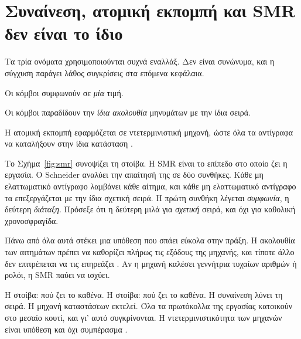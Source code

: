 \section{Συναίνεση, ατομική εκπομπή και SMR δεν είναι το ίδιο}
\label{sec:smr}

Τα τρία ονόματα χρησιμοποιούνται συχνά εναλλάξ. Δεν είναι συνώνυμα, και
η σύγχυση παράγει λάθος συγκρίσεις στα επόμενα κεφάλαια.

\begin{description}[leftmargin=2.2em,style=nextline,font=\normalfont\bfseries]
  \item[Συναίνεση (\en{consensus}).] Οι κόμβοι συμφωνούν σε \emph{μία}
  τιμή.
  \item[Ατομική εκπομπή (\en{atomic broadcast}).] Οι κόμβοι παραδίδουν
  την \emph{ίδια ακολουθία} μηνυμάτων με την ίδια σειρά.
  \item[Αναπαραγωγή μηχανής καταστάσεων (SMR).] Η ατομική εκπομπή
  εφαρμόζεται σε ντετερμινιστική μηχανή, ώστε όλα τα αντίγραφα να
  καταλήξουν στην ίδια κατάσταση \cite{schneider1990implementing}.
\end{description}

Το Σχήμα~\ref{fig:smr} συνοψίζει τη στοίβα. Η SMR είναι το επίπεδο στο
οποίο ζει η εργασία. Ο Schneider αναλύει την απαίτησή της σε δύο
συνθήκες. Κάθε μη ελαττωματικό αντίγραφο λαμβάνει κάθε αίτημα, και κάθε
μη ελαττωματικό αντίγραφο τα επεξεργάζεται με την ίδια σχετική σειρά. Η
πρώτη συνθήκη λέγεται \emph{συμφωνία}, η δεύτερη \emph{διάταξη}.
Πρόσεξε ότι η δεύτερη μιλά για \emph{σχετική} σειρά, και όχι για
καθολική χρονοσφραγίδα.

Πάνω από όλα αυτά στέκει μια υπόθεση που σπάει εύκολα στην πράξη. Η
ακολουθία των αιτημάτων πρέπει να καθορίζει πλήρως τις εξόδους της
μηχανής, και τίποτε άλλο δεν επιτρέπεται να τις επηρεάζει
\cite{schneider1990implementing}. Αν η μηχανή καλέσει γεννήτρια τυχαίων
αριθμών ή ρολόι, η SMR παύει να ισχύει.

%
{Η στοίβα: πού ζει το καθένα.}%
{Η στοίβα: πού ζει το καθένα. Η συναίνεση λύνει τη σειρά. Η μηχανή
καταστάσεων εκτελεί. Όλα τα πρωτόκολλα της εργασίας κατοικούν στο μεσαίο
κουτί, και γι' αυτό συγκρίνονται. Η ντετερμινιστικότητα των μηχανών
είναι υπόθεση και όχι συμπέρασμα \cite{schneider1990implementing}.}%
{}

